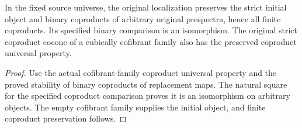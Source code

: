 \begin{proposition}
  \label{prop:actual-source-localization-finite-coproducts}
  \leanok
  In the fixed source universe, the original localization preserves the strict initial object and binary coproducts of arbitrary original prespectra, hence all finite coproducts. Its specified binary comparison is an isomorphism. The original strict coproduct cocone of a cubically cofibrant family also has the preserved coproduct universal property.
\end{proposition}
\begin{proof}
  Use the actual cofibrant-family coproduct universal property and the proved stability of binary coproducts of replacement maps. The natural square for the specified coproduct comparison proves it is an isomorphism on arbitrary objects. The empty cofibrant family supplies the initial object, and finite coproduct preservation follows.
  \leanok
\end{proof}

